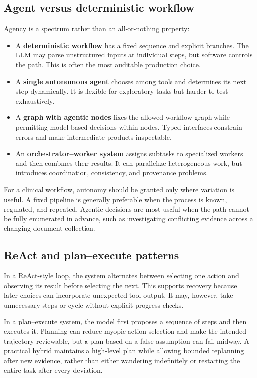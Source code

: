 \documentclass[12pt,oneside]{book}
\numberwithin{equation}{section}
\theoremstyle{definition}
\theoremstyle{plain}
\theoremstyle{remark}
\begin{document}
\subsection{Agent versus deterministic workflow}

Agency is a spectrum rather than an all-or-nothing property:
\begin{itemize}
    \item A \textbf{deterministic workflow} has a fixed sequence and explicit
    branches.  The LLM may parse unstructured inputs at individual steps, but
    software controls the path.  This is often the most auditable production
    choice.
    \item A \textbf{single autonomous agent} chooses among tools and determines
    its next step dynamically.  It is flexible for exploratory tasks but harder
    to test exhaustively.
    \item A \textbf{graph with agentic nodes} fixes the allowed workflow graph
    while permitting model-based decisions within nodes.  Typed interfaces
    constrain errors and make intermediate products inspectable.
    \item An \textbf{orchestrator--worker system} assigns subtasks to specialized
    workers and then combines their results.  It can parallelize heterogeneous
    work, but introduces coordination, consistency, and provenance problems.
\end{itemize}

For a clinical workflow, autonomy should be granted only where variation is
useful.  A fixed pipeline is generally preferable when the process is known,
regulated, and repeated.  Agentic decisions are most useful when the path
cannot be fully enumerated in advance, such as investigating conflicting
evidence across a changing document collection.

\subsection{ReAct and plan--execute patterns}

In a ReAct-style loop, the system alternates between selecting one action and
observing its result before selecting the next.  This supports recovery because
later choices can incorporate unexpected tool output.  It may, however, take
unnecessary steps or cycle without explicit progress checks.

In a plan--execute system, the model first proposes a sequence of steps and then
executes it.  Planning can reduce myopic action selection and make the intended
trajectory reviewable, but a plan based on a false assumption can fail midway.
A practical hybrid maintains a high-level plan while allowing bounded
replanning after new evidence, rather than either wandering indefinitely or
restarting the entire task after every deviation.
\end{document}
